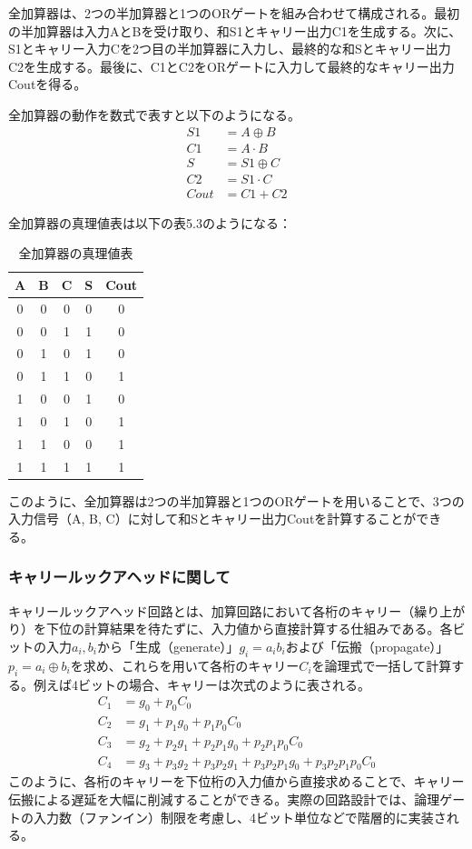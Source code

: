 \documentclass{jlreq}
\numberwithin{equation}{section}
\begin{document}
全加算器は、2つの半加算器と1つのORゲートを組み合わせて構成される。最初の半加算器は入力AとBを受け取り、和S1とキャリー出力C1を生成する。次に、S1とキャリー入力Cを2つ目の半加算器に入力し、最終的な和Sとキャリー出力C2を生成する。最後に、C1とC2をORゲートに入力して最終的なキャリー出力Coutを得る。

全加算器の動作を数式で表すと以下のようになる。
\begin{align}
  S1 &= A \oplus B \\
  C1 &= A \cdot B \\
  S &= S1 \oplus C \\
  C2 &= S1 \cdot C \\
  Cout &= C1 + C2
\end{align}

全加算器の真理値表は以下の表5.3のようになる：
\begin{table}[H]
  \centering
  \caption{全加算器の真理値表}
  \begin{tabular}{|c|c|c|c|c|}
    \hline
    A & B & C & S & Cout \\ \hline
    0 & 0 & 0 & 0 & 0 \\ \hline
    0 & 0 & 1 & 1 & 0 \\ \hline
    0 & 1 & 0 & 1 & 0 \\ \hline
    0 & 1 & 1 & 0 & 1 \\ \hline
    1 & 0 & 0 & 1 & 0 \\ \hline
    1 & 0 & 1 & 0 & 1 \\ \hline
    1 & 1 & 0 & 0 & 1 \\ \hline
    1 & 1 & 1 & 1 & 1 \\ \hline
  \end{tabular}
\end{table}

このように、全加算器は2つの半加算器と1つのORゲートを用いることで、3つの入力信号（A, B, C）に対して和Sとキャリー出力Coutを計算することができる。

\subsubsection{キャリールックアヘッドに関して}

キャリールックアヘッド回路とは、加算回路において各桁のキャリー（繰り上がり）を下位の計算結果を待たずに、入力値から直接計算する仕組みである。各ビットの入力$a_i, b_i$から「生成（generate）」$g_i = a_i b_i$および「伝搬（propagate）」$p_i = a_i \oplus b_i$を求め、これらを用いて各桁のキャリー$C_i$を論理式で一括して計算する。例えば4ビットの場合、キャリーは次式のように表される。
\begin{align*}
C_1 &= g_0 + p_0 C_0 \\
C_2 &= g_1 + p_1 g_0 + p_1 p_0 C_0 \\
C_3 &= g_2 + p_2 g_1 + p_2 p_1 g_0 + p_2 p_1 p_0 C_0 \\
C_4 &= g_3 + p_3 g_2 + p_3 p_2 g_1 + p_3 p_2 p_1 g_0 + p_3 p_2 p_1 p_0 C_0
\end{align*}
このように、各桁のキャリーを下位桁の入力値から直接求めることで、キャリー伝搬による遅延を大幅に削減することができる。実際の回路設計では、論理ゲートの入力数（ファンイン）制限を考慮し、4ビット単位などで階層的に実装される。
\end{document}
